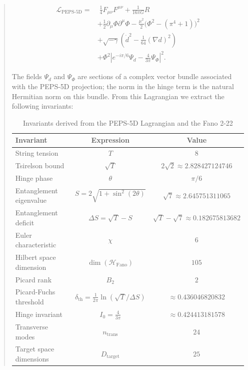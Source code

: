 \documentclass[12pt]{article}
\begin{document}
\begin{abstract}
\begin{equation}
\boxed{
\begin{aligned}
\mathcal{L}_{\text{PEPS-5D}} = &\;\frac{1}{4} F_{\mu\nu}F^{\mu\nu}
+ \frac{1}{16\pi G} R \\
&+ \frac{1}{2}\partial_\mu\Phi\partial^\mu\Phi - \frac{\mu^2}{2}\bigl(\Phi^2 - (\pi^4+1)\bigr)^2 \\
&+ \sqrt{-\gamma}\left(\dot{d}^2 - \frac{1}{64}(\nabla d)^2\right) \\
&+ \Phi^2 \left| e^{-i\pi/6} \Psi_d - \frac{4}{3\pi} \Psi_\Phi \right|^2 .
\end{aligned}
}
\label{eq:lagrangian}
\end{equation}

The fields \(\Psi_d\) and \(\Psi_\Phi\) are sections of a complex vector bundle associated with the PEPS-5D projection; the norm in the hinge term is the natural Hermitian norm on this bundle. From this Lagrangian we extract the following invariants:

\begin{table}[h]
\centering
\caption{Invariants derived from the PEPS-5D Lagrangian and the Fano 2-22}
\label{tab:invariants}
\begin{tabular}{lcc}
\toprule
\textbf{Invariant} & \textbf{Expression} & \textbf{Value} \\
\midrule
String tension & \(T\) & \(8\) \\
Tsirelson bound & \(\sqrt{T}\) & \(2\sqrt{2} \approx 2.828427124746\) \\
Hinge phase & \(\theta\) & \(\pi/6\) \\
Entanglement eigenvalue & \(S = 2\sqrt{1+\sin^2(2\theta)}\) & \(\sqrt{7} \approx 2.645751311065\) \\
Entanglement deficit & \(\Delta S = \sqrt{T} - S\) & \(\sqrt{T} - \sqrt{7} \approx 0.182675813682\) \\
Euler characteristic & \(\chi\) & \(6\) \\
Hilbert space dimension & \(\dim(\mathcal{H}_{\text{Fano}})\) & \(105\) \\
Picard rank & \(B_2\) & \(2\) \\
Picard-Fuchs threshold & \(\delta_{\text{th}} = \frac{1}{2\pi}\ln(\sqrt{T}/\Delta S)\) & \(\approx 0.436046820832\) \\
Hinge invariant & \(I_0 = \frac{4}{3\pi}\) & \(\approx 0.424413181578\) \\
Transverse modes & \(n_{\text{trans}}\) & \(24\) \\
Target space dimensions & \(D_{\text{target}}\) & \(25\) \\
\hline
\end{tabular}
\end{table}


\end{abstract}
\end{document}
